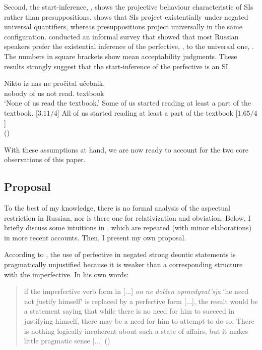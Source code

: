 \documentclass[output=paper,
modfonts,
newtxmath,colorlinks,citecolor=brown
]{langscibook}
\begin{document}
\noindent Second, the start-inference, , shows the projective behaviour characteristic of SIs rather than presuppositions. \cite{che09} shows that SIs project existentially under negated universal quantifiers, whereas presuppositions project universally in the same configuration. \cite{zinfil14} conducted an informal survey that showed that most Russian speakers prefer  the existential inference of the perfective, , to the universal one, . The numbers in square brackets show mean acceptability judgments. These results strongly suggest that the start-inference of the perfective is an SI.

\ea \label{project} \ea \gll Nikto iz nas ne pročital učebnik. \\
        	nobody of us not {read.\p} textbook \\ 			\glt `None of us read the textbook.'  
        \ex Some of us started reading at least a part of the textbook. \hfill [$3.11/4$] \label{exist}
    \ex All of us started reading at least a part of the textbook \hfill [$1.65/4$] \label{univ}\\
    \hfill (\citealt[396--398]{zinfil14})
	\z \z         

\noindent With these assumptions at hand, we are now ready to  account for the two core observations of this paper.
 
 \subsection{Proposal}\label{subsect:proposalnutshell}
 To the best of my knowledge, there is no formal analysis of the aspectual restriction in Russian, nor is there one for relativization and obviation. Below, I briefly discuss some intuitions in \cite{rap85}, which are repeated (with minor elaborations) in more recent accounts. Then, I present my own proposal.

According to \cite{rap85}, the use of perfective in negated strong deontic statements is pragmatically unjustified because it is weaker than a corresponding structure with the imperfective. In his own words:

	\begin{quote}
	if the imperfective verb form in [...] \textit{on ne dolžen opravdyvat'sja} `he need not justify himself' is replaced by a perfective form [...], the result would be a statement saying that while there is no need for him to succeed in justifying himself, there may be a need for him to attempt to do so. There is nothing logically incoherent about such a state of affairs, but it makes little pragmatic sense [...]   \hfill (\citealt[218--219]{rap85})
	\end{quote}
\end{document}
